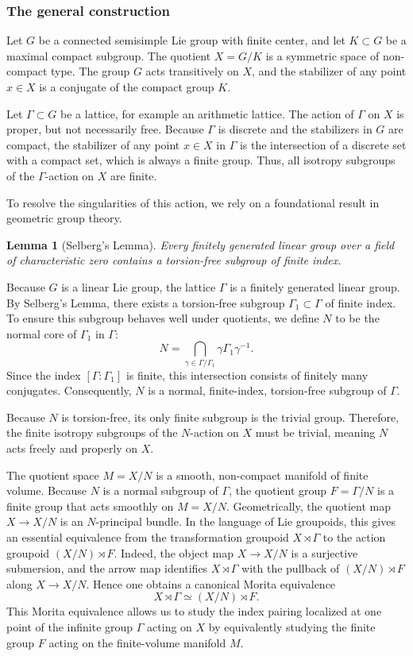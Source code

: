 \documentclass[a4paper]{amsart}
\newcommand\<{\langle}
\renewcommand\>{\rangle}
\newtheorem{lem}[theorem]{Lemma}
\theoremstyle{definition}
\theoremstyle{remark}
\begin{document}
\subsubsection{The general construction}

Let $G$ be a connected semisimple Lie group with finite center, and let $K \subset G$ be a maximal compact subgroup.
The quotient $X = G/K$ is a symmetric space of non-compact type. The group $G$ acts transitively on $X$,
and the stabilizer of any point $x \in X$ is a conjugate of the compact group $K$.

Let $\Gamma \subset G$ be a lattice, for example an arithmetic lattice. The action of $\Gamma$ on $X$ is proper,
but not necessarily free. Because $\Gamma$ is discrete and the stabilizers in $G$ are compact,
the stabilizer of any point $x \in X$ in $\Gamma$ is the intersection of a discrete set with a compact set,
which is always a finite group. Thus, all isotropy subgroups of the $\Gamma$-action on $X$ are finite.

To resolve the singularities of this action, we rely on a foundational result in geometric group theory.

\begin{lem}[Selberg's Lemma]
Every finitely generated linear group over a field of characteristic zero contains a torsion-free subgroup of finite index.
\end{lem}

Because $G$ is a linear Lie group, the lattice $\Gamma$ is a finitely generated linear group.
By Selberg's Lemma, there exists a torsion-free subgroup $\Gamma_1 \subset \Gamma$ of finite index.
To ensure this subgroup behaves well under quotients, we define $N$ to be the normal core of $\Gamma_1$ in $\Gamma$:
$$ N = \bigcap_{\gamma \in \Gamma/\Gamma_1} \gamma \Gamma_1 \gamma^{-1} .$$
Since the index $[\Gamma : \Gamma_1]$ is finite, this intersection consists of finitely many conjugates.
Consequently, $N$ is a normal, finite-index, torsion-free subgroup of $\Gamma$.

Because $N$ is torsion-free, its only finite subgroup is the trivial group.
Therefore, the finite isotropy subgroups of the $N$-action on $X$ must be trivial, meaning $N$ acts freely and properly on $X$.

The quotient space $M = X/N$ is a smooth, non-compact manifold of finite volume.
Because $N$ is a normal subgroup of $\Gamma$, the quotient group $F = \Gamma/N$ is a finite group that acts smoothly on $M = X/N$.
Geometrically, the quotient map $X \to X/N$ is an $N$-principal bundle. In the language of Lie groupoids,
this gives an essential equivalence from the transformation groupoid $X \rtimes \Gamma$ to the action groupoid $(X/N) \rtimes F$.
Indeed, the object map $X \to X/N$ is a surjective submersion,
and the arrow map identifies $X \rtimes \Gamma$ with the pullback of $(X/N) \rtimes F$ along $X \to X/N$.
Hence one obtains a canonical Morita equivalence
$$ X \rtimes \Gamma \simeq (X/N) \rtimes F .$$
This Morita equivalence allows us to study the index pairing localized at one point of the infinite group $\Gamma$ acting on $X$
by equivalently studying the finite group $F$ acting on the finite-volume manifold $M$.
\end{document}
